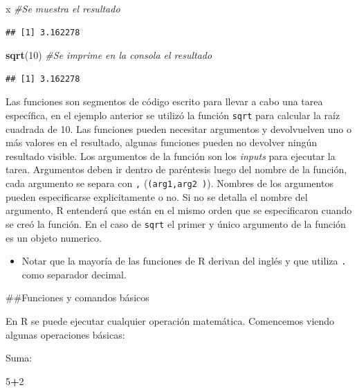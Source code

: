 \documentclass[]{book}
\newenvironment{Shaded}{\begin{snugshade}}{\end{snugshade}}
\newcommand{\KeywordTok}[1]{\textcolor[rgb]{0.13,0.29,0.53}{\textbf{#1}}}
\newcommand{\DecValTok}[1]{\textcolor[rgb]{0.00,0.00,0.81}{#1}}
\newcommand{\CommentTok}[1]{\textcolor[rgb]{0.56,0.35,0.01}{\textit{#1}}}
\newcommand{\OperatorTok}[1]{\textcolor[rgb]{0.81,0.36,0.00}{\textbf{#1}}}
\newcommand{\NormalTok}[1]{#1}
\newenvironment{rmdblock}[1]
{\begin{shaded*}
		\begin{itemize}
			\renewcommand{\labelitemi}{
				\raisebox{-.7\height}[0pt][0pt]{
					{\setkeys{Gin}{width=3em,keepaspectratio}\texttt{[image: images/\#1]}}
				}
			}
			\item
		}
		{
		\end{itemize}
	\end{shaded*}
}
\newenvironment{rmdnote}
{\begin{rmdblock}{note}}
	{\end{rmdblock}}
\begin{document}
\begin{Shaded}
\begin{Highlighting}[]
\NormalTok{x }\CommentTok{#Se muestra el resultado}
\end{Highlighting}
\end{Shaded}

\begin{verbatim}
## [1] 3.162278
\end{verbatim}

\begin{Shaded}
\begin{Highlighting}[]
\KeywordTok{sqrt}\NormalTok{(}\DecValTok{10}\NormalTok{) }\CommentTok{#Se imprime en la consola el resultado}
\end{Highlighting}
\end{Shaded}

\begin{verbatim}
## [1] 3.162278
\end{verbatim}

Las funciones son segmentos de código escrito para llevar a cabo una
tarea específica, en el ejemplo anterior se utilizó la función
\texttt{sqrt} para calcular la raíz cuadrada de 10. Las funciones pueden
necesitar argumentos y devolvuelven uno o más valores en el resultado,
algunas funciones pueden no devolver ningún resultado visible. Los
argumentos de la función son los \emph{inputs} para ejecutar la tarea.
Argumentos deben ir dentro de paréntesis luego del nombre de la función,
cada argumento se separa con \texttt{,} (\texttt{(arg1,arg2\ )}).
Nombres de los argumentos pueden especificarse explicitamente o no. Si
no se detalla el nombre del argumento, R entenderá que están en el mismo
orden que se especificaron cuando se creó la función. En el caso de
\texttt{sqrt} el primer y único argumento de la función es un objeto
numerico.

\begin{rmdnote}
Notar que la mayoría de las funciones de R derivan del inglés y que
utiliza \texttt{.} como separador decimal.
\end{rmdnote}

\#\#Funciones y comandos básicos

En R se puede ejecutar cualquier operación matemática. Comencemos viendo
algunas operaciones básicas:

Suma:

\begin{Shaded}
\begin{Highlighting}[]
\DecValTok{5}\OperatorTok{+}\DecValTok{2}
\end{Highlighting}
\end{Shaded}
\end{document}
